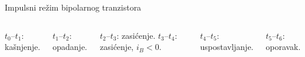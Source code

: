 \begin{frame}[label=10-s008]{Impulsni režim bipolarnog tranzistora}
\setlength{\abovedisplayskip}{4pt}\setlength{\belowdisplayskip}{4pt}\setlength{\abovedisplayshortskip}{3pt}\setlength{\belowdisplayshortskip}{3pt}
\begin{columns}[T,onlytextwidth]\centering
\par\medskip
{}\centering \end{columns}\medskip
\begin{columns}[T,onlytextwidth]
$t_0$–$t_1$: kašnjenje.\par $t_1$–$t_2$: opadanje.\par $t_2$–$t_3$: zasićenje.
$t_3$–$t_4$: zasićenje, $i_B<0$.\par $t_4$–$t_5$: uspostavljanje.\par $t_5$–$t_6$: oporavak.
\end{columns}
\end{frame}

